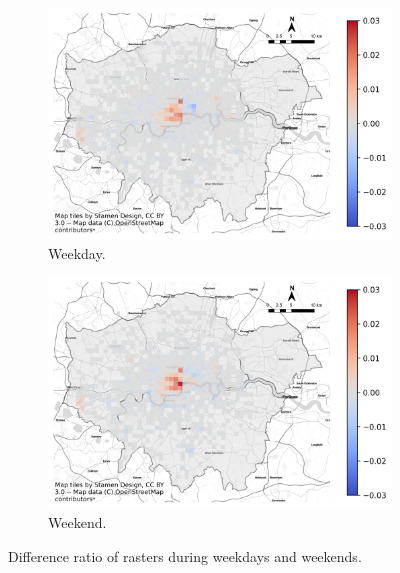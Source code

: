 \documentclass{article}
\begin{document}
\begin{figure}[!h]

\begin{subfigure}{0.5\textwidth}
\includegraphics[width=1\linewidth]{figures/raster_diff_weekday.png} 
\caption{Weekday.}
\label{fig:raster_diff_weekday}
\end{subfigure}
\begin{subfigure}{0.5\textwidth}
\includegraphics[width=1\linewidth]{figures/raster_diff_weekend.png}
\caption{Weekend.}
\label{fig:raster_diff_weekend}
\end{subfigure}

\caption{Difference ratio of rasters during weekdays and weekends.} \label{fig:raster_diff_week}
\end{figure}
\end{document}
